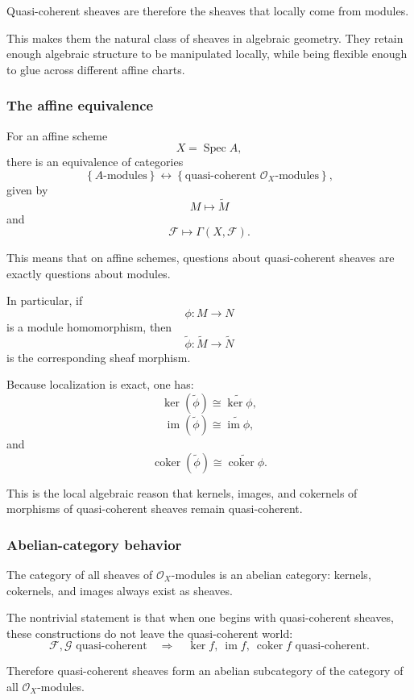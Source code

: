 \documentclass[12pt,a4paper]{article}
\DeclareMathOperator{\im}{im}
\DeclareMathOperator{\coker}{coker}
\DeclareMathOperator{\Spec}{Spec}
\newcommand{\OO}{\mathcal{O}}
\providecommand{\Spec}{\operatorname{Spec}}
\theoremstyle{notespace}
\begin{document}
Quasi-coherent sheaves are therefore the sheaves that locally come from modules.

This makes them the natural class of sheaves in algebraic geometry. They retain enough algebraic structure to be manipulated locally, while being flexible enough to glue across different affine charts.

\subsubsection{The affine equivalence}

For an affine scheme
\[
X=\Spec A,
\]
there is an equivalence of categories
\[
\left\{
A\text{-modules}
\right\}
\longleftrightarrow
\left\{
\text{quasi-coherent }\OO_X\text{-modules}
\right\},
\]
given by
\[
M\longmapsto \widetilde M
\]
and
\[
\mathcal{F}\longmapsto \Gamma(X,\mathcal{F}).
\]

This means that on affine schemes, questions about quasi-coherent sheaves are exactly questions about modules.

In particular, if
\[
\phi:M\longrightarrow N
\]
is a module homomorphism, then
\[
\widetilde{\phi}:\widetilde{M}\longrightarrow\widetilde{N}
\]
is the corresponding sheaf morphism.

Because localization is exact, one has:
\[
\ker(\widetilde{\phi})
\cong
\widetilde{\ker\phi},
\]
\[
\im(\widetilde{\phi})
\cong
\widetilde{\im\phi},
\]
and
\[
\coker(\widetilde{\phi})
\cong
\widetilde{\coker\phi}.
\]

This is the local algebraic reason that kernels, images, and cokernels of morphisms of quasi-coherent sheaves remain quasi-coherent.

\subsubsection{Abelian-category behavior}

The category of all sheaves of \(\OO_X\)-modules is an abelian category: kernels, cokernels, and images always exist as sheaves.

The nontrivial statement is that when one begins with quasi-coherent sheaves, these constructions do not leave the quasi-coherent world:
\[
\mathcal{F},\mathcal{G}\text{ quasi-coherent}
\quad\Longrightarrow\quad
\ker f,\ \im f,\ \coker f\text{ quasi-coherent}.
\]

Therefore quasi-coherent sheaves form an abelian subcategory of the category of all \(\OO_X\)-modules.
\end{document}
